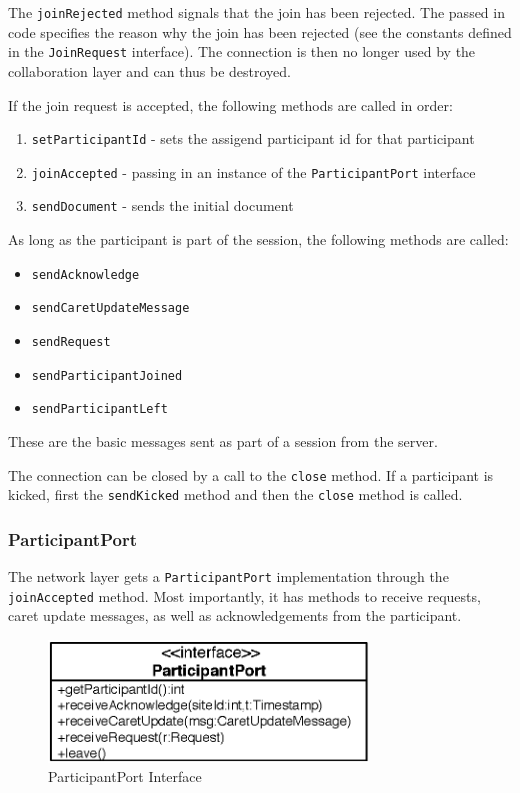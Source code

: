 The \texttt{join\-Rejected} method signals that the join has been rejected. 
The passed in code specifies the reason why the join has been rejected 
(see the constants defined in the \texttt{Join\-Request} interface).
The connection is then no longer used by the collaboration layer and can thus
be destroyed.

If the join request is accepted, the following methods are called in order:
\begin{enumerate}
 \item \texttt{setParticipantId} - sets the assigend participant id for that participant
 \item \texttt{joinAccepted} - passing in an instance of the \texttt{ParticipantPort} interface
 \item \texttt{sendDocument} - sends the initial document
\end{enumerate} 

As long as the participant is part of the session, the following methods
are called:
\begin{itemize}
 \item \texttt{sendAcknowledge} 
 \item \texttt{sendCaretUpdateMessage}
 \item \texttt{sendRequest}
 \item \texttt{sendParticipantJoined}
 \item \texttt{sendParticipantLeft}
\end{itemize}

These are the basic messages sent as part of a session from the server.

The connection can be closed by a call to the \texttt{close} method. If a 
participant is kicked, first the \texttt{send\-Kicked} method and then the
\texttt{close} method is called.


\subsubsection{ParticipantPort}
The network layer gets a \texttt{Participant\-Port} implementation through
the \texttt{join\-Accepted} method. Most importantly, it has methods to receive
requests, caret update messages, as well as acknowledgements from the 
participant.

\begin{figure}[H]
 \centering
 \includegraphics[width=8.50cm,height=3.25cm]{../images/finalreport/architecture_participantport_uml.eps}
 \caption{ParticipantPort Interface}
 \label{fig:archoverview.participantport}
\end{figure}

